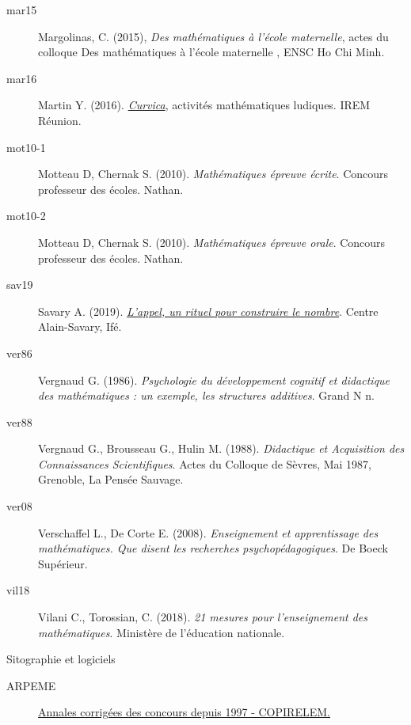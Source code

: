 {\begin{description}
   \item[mar15] Margolinas, C. (2015), {\it Des mathématiques à l’école maternelle}, actes du colloque \og Des mathématiques à l’école maternelle \fg, ENSC Ho Chi Minh.
   
   \item[mar16] Martin Y. (2016). \href{http://irem.univ-reunion.fr/spip.php?article802}{\it Curvica}, activités mathématiques ludiques. IREM Réunion.

   \item[mot10-1] Motteau D, Chernak S. (2010). {\it Mathématiques épreuve écrite}. Concours professeur des écoles. Nathan.
   \item[mot10-2] Motteau D, Chernak S. (2010). {\it Mathématiques épreuve orale}. Concours professeur des écoles. Nathan.

   \item[sav19] Savary A. (2019). \href{http://centre-alain-savary.ens-lyon.fr/CAS/mathematiques-en-education-prioritaire/premieres-annees-de-mathernelle-1/situations-de-classe-et-entretien/lappel-emilie-et-elisabeth}{\it L'appel, un rituel pour construire le nombre}. Centre Alain-Savary, Ifé.
   
   \item[ver86] Vergnaud G. (1986). {\it Psychologie
du développement cognitif et didactique des mathématiques : un exemple, les structures additives}. Grand N n.
   \item[ver88] Vergnaud G., Brousseau G., Hulin M. (1988). {\it Didactique et Acquisition des Connaissances Scientifiques}. Actes du Colloque de Sèvres, Mai 1987, Grenoble, La Pensée Sauvage.
   
   \item[ver08] Verschaffel L., De Corte E. (2008). {\it Enseignement et apprentissage des mathématiques. Que disent les recherches psychopédagogiques}. De Boeck Supérieur.
   
   \item[vil18] Vilani C., Torossian, C. (2018). {\it 21 mesures pour l'enseignement des mathématiques}. Ministère de l'éducation nationale.
\end{description}

\bigskip


\textcolor{A1}{\Large Sitographie et logiciels}

\begin{description}
   \item[ARPEME] \href{http://www.arpeme.fr/index.php?id_page=27}{Annales corrigées des concours depuis 1997 - COPIRELEM.}
   

\end{description}}
